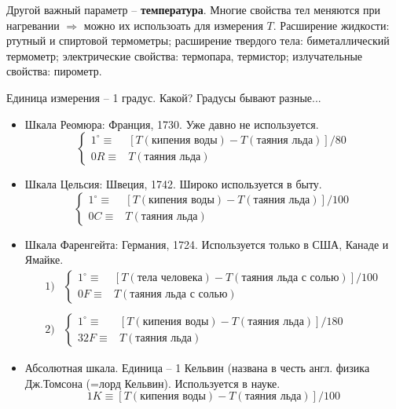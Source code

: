 \documentclass[12pt,epsfig,color,russian]{article}
\begin{document}
Другой важный параметр -- {\bf температура}. Многие свойства тел ме\-ня\-ют\-ся при нагревании $\Rightarrow$ можно их использоать для измерения $T$. Рас\-ши\-ре\-ние жидкости: ртутный и спиртовой термометры; расширение твер\-до\-го тела: биметаллический термометр; электрические свойства: термо\-пара, термистор; излучательные свойства: пирометр.

Единица измерения -- 1 градус. Какой? Градусы бывают разные...
\begin{itemize}
\item Шкала Реомюра: Франция, 1730. Уже давно не используется.
 \begin{displaymath}
 \left\{
 \begin{array}{cl}
 1^\circ\equiv & \left[T(\texttt{кипения воды})-T(\texttt{таяния льда})\right]/80\\
 0R\equiv &T(\texttt{таяния льда})
 \end{array}
 \right.
 \end{displaymath}
\item Шкала Цельсия: Швеция, 1742. Широко используется в быту.
 \begin{displaymath}
 \left\{
 \begin{array}{cl}
 1^\circ\equiv & \left[T(\texttt{кипения воды})-T(\texttt{таяния льда})\right]/100\\
 0C\equiv &T(\texttt{таяния льда})
 \end{array}
 \right.
 \end{displaymath}
\item Шкала Фаренгейта: Германия, 1724. Используется только в США, Канаде и Ямайке.
 \begin{displaymath}
 \begin{array}{rl}
 1) &
 \left\{
 \begin{array}{cl}
 1^\circ\equiv & \left[T(\texttt{тела человека})-T(\texttt{таяния льда с солью})\right]/100\\
 0F\equiv &T(\texttt{таяния льда с солью})
 \end{array}
 \right.
 \\ \\
 2) &
 \left\{
 \begin{array}{cl}
 1^\circ\equiv & \left[T(\texttt{кипения воды})-T(\texttt{таяния льда})\right]/180\\
 32F\equiv &T(\texttt{таяния льда})
 \end{array}
 \right.
 \end{array}
 \end{displaymath}
\item Абсолютная шкала. Единица -- 1 Кельвин (названа в честь англ. физика Дж.Томсона (=лорд Кельвин). Используется в науке.
 \begin{displaymath}
 1K\equiv \left[T(\texttt{кипения воды})-T(\texttt{таяния льда})\right]/100
 \end{displaymath}
\end{itemize}
\end{document}
